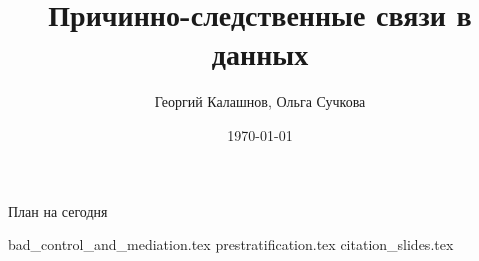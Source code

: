 \documentclass[handout,12pt]{beamer}
\title{Причинно-следственные связи в данных}
\author[Георгий Калашнов, Ольга Сучкова]{Георгий Калашнов, Ольга Сучкова}
\date{\today}
\begin{document}
\begin{frame}
  \titlepage
  \begin{flushright}
  \end{flushright}
\end{frame}


\begin{frame}{План на сегодня} 
\tableofcontents
\end{frame}

{bad_control_and_mediation.tex}
{prestratification.tex}
{citation_slides.tex}
\end{document}
